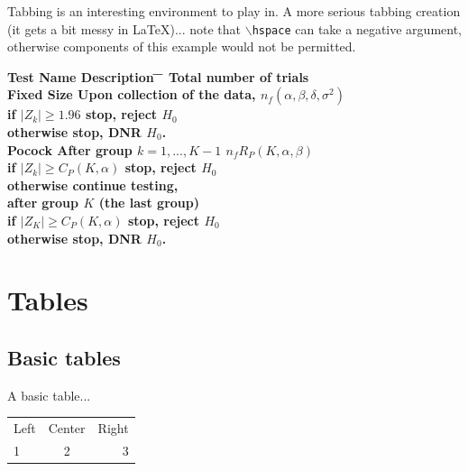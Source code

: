 \documentclass[11pt]{article} %
\begin{document}
Tabbing is an interesting environment to play in. A more serious tabbing creation (it gets a bit messy in LaTeX)... note that \texttt{$\backslash$hspace} can take a negative argument, otherwise components of this example would not be permitted.
\begin{tabbing}
\bfseries Test Name\hspace{0.17cm}
	\= \bfseries Description \hspace{-2.0cm}
	\= \hspace{4.0cm}
	\=\hspace{3.5cm}
	\= \bfseries Total number of trials \\[2ex] %
Fixed Size
	\> Upon collection of the data,
	\>	\>	
	\> $n_f(\alpha, \beta, \delta, \sigma^2)$  \\
\>
	\> if $|Z_k| \geq 1.96$
	\> stop, reject $H_0$
	\> \\
\>
	\> otherwise
	\> stop, DNR $H_0$.
	\> \\ [3ex]
Pocock
	\> After group $k=1,...,K-1$
	\>	\>
	\> $n_fR_P(K,\alpha,\beta)$ \\
\>
	\> if $|Z_k| \geq C_P(K,\alpha)$
	\> stop, reject $H_0$
	\> \\
\>
	\> otherwise
	\> continue testing,
	\> \\
\>
	after group $K$ (the last group)
	\>	\>	\> \\
\>
	\> if $|Z_K| \geq C_P(K,\alpha)$
	\> stop, reject $H_0$
	\> \\
\>
	\> otherwise
	\> stop, DNR $H_0$.
	\> \\
\end{tabbing}


\section{Tables}

\subsection{Basic tables}

A basic table... \\

\begin{tabular}{l c r} %
	Left & Center & Right \\ %
	1     & 2           & 3  \\
\end{tabular}
\end{document}
